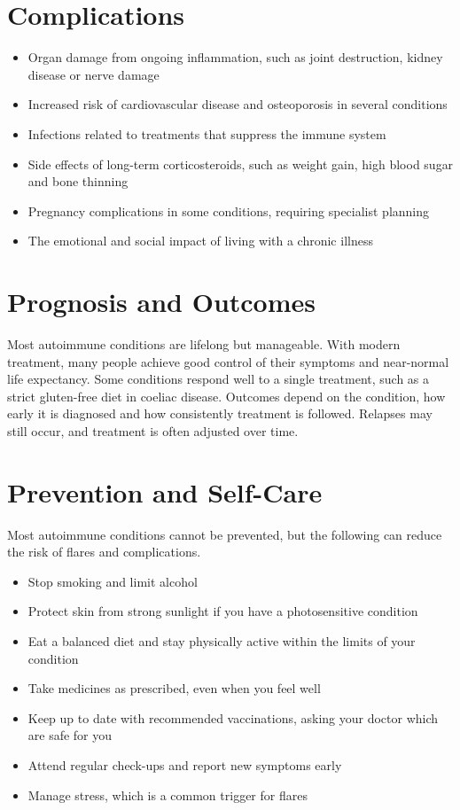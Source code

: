\section*{Complications}
\begin{itemize}
    \item Organ damage from ongoing inflammation, such as joint destruction, kidney disease or nerve damage
    \item Increased risk of cardiovascular disease and osteoporosis in several conditions
    \item Infections related to treatments that suppress the immune system
    \item Side effects of long-term corticosteroids, such as weight gain, high blood sugar and bone thinning
    \item Pregnancy complications in some conditions, requiring specialist planning
    \item The emotional and social impact of living with a chronic illness
\end{itemize}

\section*{Prognosis and Outcomes}
Most autoimmune conditions are lifelong but manageable. With modern treatment, many people achieve good control of their symptoms and near-normal life expectancy. Some conditions respond well to a single treatment, such as a strict gluten-free diet in coeliac disease. Outcomes depend on the condition, how early it is diagnosed and how consistently treatment is followed. Relapses may still occur, and treatment is often adjusted over time.

\section*{Prevention and Self-Care}
Most autoimmune conditions cannot be prevented, but the following can reduce the risk of flares and complications.

\begin{itemize}
    \item Stop smoking and limit alcohol
    \item Protect skin from strong sunlight if you have a photosensitive condition
    \item Eat a balanced diet and stay physically active within the limits of your condition
    \item Take medicines as prescribed, even when you feel well
    \item Keep up to date with recommended vaccinations, asking your doctor which are safe for you
    \item Attend regular check-ups and report new symptoms early
    \item Manage stress, which is a common trigger for flares
\end{itemize}

